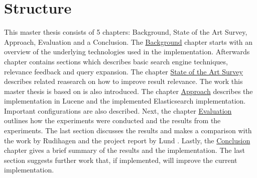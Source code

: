 \section{Structure}
This master thesis consists of 5 chapters: Background, State of the Art Survey, Approach, Evaluation and a Conclusion.
The \hyperref[ch:background]{Background} chapter starts with an overview of the underlying technologies used in the implementation.
Afterwards chapter contains sections which describes basic search engine techniques, relevance feedback and query expansion.
The chapter \hyperref[ch:related-work]{State of the Art Survey} describes related reasearch on how to improve result relevance.
The work this master thesis is based on is also introduced.
The chapter \hyperref[ch:approach]{Approach} describes the implementation in Lucene and the implemented Elasticsearch implementation.
Important configurations are also described.
Next, the chapter \hyperref[ch:evaluation]{Evaluation} outlines how the experiments were conducted and the results from the experiments.
The last section discusses the results and makes a comparison with the work by Rudihagen \cite{master-thesis} and the project report by Lund \cite{project-report}.
Lastly, the \hyperref[ch:conclusion]{Conclusion} chapter gives a brief summary of the results and the implementation.
The last section suggests further work that, if implemented, will improve the current implementation.
